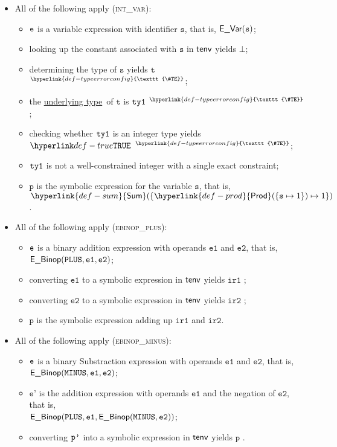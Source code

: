 \documentclass{book}
\newcommand\TypeErrorConfig[0]{\hyperlink{def-typeerrorconfig}{\texttt{\#TE}}}
\newcommand\ProseOrTypeError[0]{\hyperlink{def-proseortypeerror}{$^{\TypeErrorConfig}$}}
\newcommand\Prod[0]{\hyperlink{def-prod}{\textsf{Prod}}}
\newcommand\Sum[0]{\hyperlink{def-sum}{\textsf{Sum}}}
\newcommand\underlyingtype[0]{\hyperlink{def-underlyingtype}{underlying type}}
\newcommand\vp[0]{\texttt{p}}
\newcommand\vt[0]{\texttt{t}}
\newcommand\veone[0]{\texttt{e1}}
\newcommand\vetwo[0]{\texttt{e2}}
\newcommand\vs[0]{\texttt{s}}
\newcommand\irone[0]{\texttt{ir1}}
\newcommand\irtwo[0]{\texttt{ir2}}
\newcommand\vep[0]{\texttt{e'}}
\begin{document}
\begin{itemize}
  \item All of the following apply (\textsc{int\_var}):
  \begin{itemize}
    \item $\texttt{e}$ is a variable expression with identifier $\vs$, that is, $\EVar(\vs)$;
    \item looking up the constant associated with $\vs$ in $\textsf{tenv}$ yields $\bot$;
    \item determining the type of $\vs$ yields $\vt$ \ProseOrTypeError;
    \item the \underlyingtype\ of $\vt$ is $\texttt{ty1}$ \ProseOrTypeError;
    \item checking whether $\texttt{ty1}$ is an integer type yields $\True$ \ProseOrTypeError;
    \item $\texttt{ty1}$ is not a well-constrained integer with a single exact constraint;
    \item $\vp$ is the symbolic expression for the variable $\vs$, that is, $\Sum( \{ \Prod(\{\vs\mapsto 1\})\mapsto 1 \} )$.
  \end{itemize}

  \item All of the following apply (\textsc{ebinop\_plus}):
  \begin{itemize}
    \item $\texttt{e}$ is a binary addition expression with operands $\veone$ and $\vetwo$, that is, \\ $\EBinop(\PLUS, \veone, \vetwo)$;
    \item converting $\veone$ to a symbolic expression in $\textsf{tenv}$ yields $\irone$ \ProseOrTypeErrorOrBot;
    \item converting $\vetwo$ to a symbolic expression in $\textsf{tenv}$ yields $\irtwo$ \ProseOrTypeErrorOrBot;
    \item $\vp$ is the symbolic expression adding up $\irone$ and $\irtwo$.
  \end{itemize}

  \item All of the following apply (\textsc{ebinop\_minus}):
  \begin{itemize}
    \item $\texttt{e}$ is a binary Substraction expression with operands $\veone$ and $\vetwo$, that is, \\ $\EBinop(\MINUS, \veone, \vetwo)$;
    \item $\vep$ is the addition expression with operands $\veone$ and the negation of $\vetwo$, that is, \\ $\EBinop(\PLUS, \veone, \EBinop(\MINUS, \vetwo))$;
    \item converting $\texttt{p'}$ into a symbolic expression in $\textsf{tenv}$ yields $\vp$ \ProseOrTypeErrorOrBot.
  \end{itemize}


\end{itemize}
\end{document}
